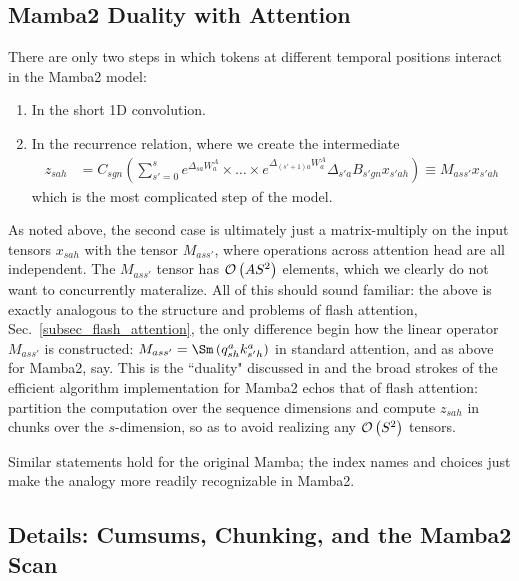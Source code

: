 \documentclass[11pt]{article}
\begin{document}
\subsection{Mamba2 Duality with Attention}

There are only two steps in which tokens at different temporal positions interact in the Mamba2
model:
\begin{enumerate}
    \item In the short 1D convolution.
    \item In the recurrence relation, where we create the intermediate
        \begin{align}
        z _{ sah } &= C _{ sgn }\left (\sum _{ s'=0 }^{ s }e^{ \Delta _{ sa }W^{A} _{ a } }\times \ldots \times e^{ \Delta _{ (s'+1)a }W^{A} _{ a } } \Delta _{ s'a }B _{ s'gn } x _{ s'ah }\right ) \equiv  M  _{ ass' }x _{ s'ah }
        \end{align}
        which is the most complicated step of the model.
\end{enumerate}

As noted above, the second case is ultimately just a matrix-multiply on the input tensors $ x _{ sah
} $ with the tensor $ M _{ ass' } $, where operations across attention head are all independent. The
$ M _{ ass' } $ tensor has $ \mathcal{O} \left( A S ^{ 2 } \right)  $ elements, which we clearly do not want
to concurrently materalize. All of this should sound familiar: the above is exactly analogous to the
structure and problems of flash attention, Sec.~\ref{subsec_flash_attention}, the only difference begin how the linear operator $ M _{
ass' } $ is constructed: $ M _{ ass' } = \Sm \left (q ^{ a }_{ sh }k ^{ a }_{ s'h } \right ) $
in standard attention, and as above for Mamba2, say. This is the ``duality" discussed in
\cite{dao2024transformersssmsgeneralizedmodels} and the broad strokes of the efficient algorithm
implementation for Mamba2 echos that of flash attention: partition the computation over the sequence
dimensions and compute $ z _{ sah } $ in chunks over the $ s $-dimension, so as to avoid realizing
any $ \mathcal{O} \left( S ^{ 2 } \right)  $ tensors.

Similar statements hold for the original Mamba; the index names and choices just make the analogy
more readily recognizable in Mamba2.

\subsection{Details: Cumsums, Chunking, and the Mamba2 Scan}
\end{document}

